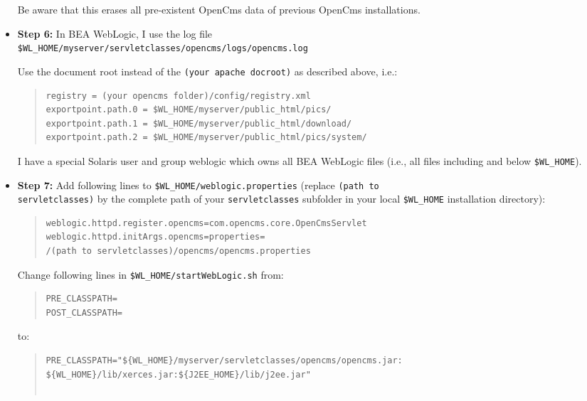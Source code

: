 \begin{itemize}
Be aware that this erases all pre-existent OpenCms data of previous
OpenCms installations.

\item \textbf{Step 6:} In BEA WebLogic, I use the log file \\
\texttt{\$WL\_HOME/myserver/servletclasses/opencms/logs/opencms.log}

Use the document root instead of the \texttt{(your apache docroot)} as described above, i.e.:

\begin{quote}
\begin{verbatim}
registry = (your opencms folder)/config/registry.xml
exportpoint.path.0 = $WL_HOME/myserver/public_html/pics/
exportpoint.path.1 = $WL_HOME/myserver/public_html/download/
exportpoint.path.2 = $WL_HOME/myserver/public_html/pics/system/
\end{verbatim}
\end{quote}

I have a special Solaris user and
group weblogic which owns all BEA WebLogic files (i.e., all files
including and below \texttt{\$WL\_HOME}).

\item \textbf{Step 7:} Add following lines to \texttt{\$WL\_HOME/weblogic.properties}
(replace \texttt{(path to \\
servletclasses)} by the complete path of your \texttt{servletclasses}
subfolder in your local \texttt{\$WL\_HOME} installation directory):

\begin{quote}
\begin{verbatim}
weblogic.httpd.register.opencms=com.opencms.core.OpenCmsServlet
weblogic.httpd.initArgs.opencms=properties= 
/(path to servletclasses)/opencms/opencms.properties
\end{verbatim}
\end{quote}


Change following lines in \texttt{\$WL\_HOME/startWebLogic.sh} from:

\begin{quote}
\begin{verbatim}
PRE_CLASSPATH=
POST_CLASSPATH=
\end{verbatim}
\end{quote}

to:

\begin{quote}
\begin{verbatim}
PRE_CLASSPATH="${WL_HOME}/myserver/servletclasses/opencms/opencms.jar:
${WL_HOME}/lib/xerces.jar:${J2EE_HOME}/lib/j2ee.jar"


\end{verbatim}
\end{quote}
\end{itemize}
